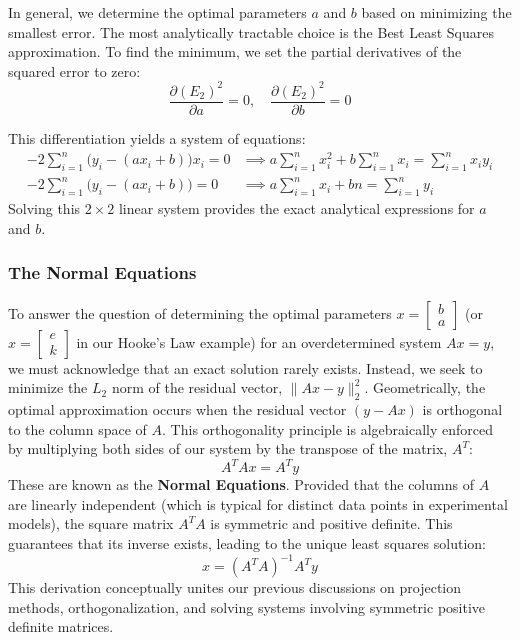\documentclass[12pt, a4paper]{article}
\theoremstyle{break}
\begin{document}
In general, we determine the optimal parameters $a$ and $b$ based on minimizing the smallest error. The most analytically tractable choice is the Best Least Squares approximation.
To find the minimum, we set the partial derivatives of the squared error to zero:
\begin{equation*}
    \frac{\partial (E_2)^2}{\partial a} = 0, \quad \frac{\partial (E_2)^2}{\partial b} = 0
\end{equation*}

This differentiation yields a system of equations:
\begin{align*}
    -2 \sum_{i=1}^n \big(y_i - (ax_i + b)\big)x_i = 0 &\implies a\sum_{i=1}^n x_i^2 + b\sum_{i=1}^n x_i = \sum_{i=1}^n x_i y_i \\
    -2 \sum_{i=1}^n \big(y_i - (ax_i + b)\big) = 0 &\implies a\sum_{i=1}^n x_i + bn = \sum_{i=1}^n y_i
\end{align*}
Solving this $2 \times 2$ linear system provides the exact analytical expressions for $a$ and $b$.
\subsubsection*{The Normal Equations}
To answer the question of determining the optimal parameters $x = \begin{bmatrix} b \\ a \end{bmatrix}$ (or $x = \begin{bmatrix} e \\ k \end{bmatrix}$ in our Hooke's Law example) for an overdetermined system $Ax = y$, we must acknowledge that an exact solution rarely exists.
Instead, we seek to minimize the $L_2$ norm of the residual vector, $\|Ax - y\|_2^2$.
Geometrically, the optimal approximation occurs when the residual vector $(y - Ax)$ is orthogonal to the column space of $A$.
This orthogonality principle is algebraically enforced by multiplying both sides of our system by the transpose of the matrix, $A^T$:
\begin{equation*}
    A^T A x = A^T y
\end{equation*}
These are known as the \textbf{Normal Equations}.
Provided that the columns of $A$ are linearly independent (which is typical for distinct data points in experimental models), the square matrix $A^T A$ is symmetric and positive definite.
This guarantees that its inverse exists, leading to the unique least squares solution:
\begin{equation*}
    x = (A^T A)^{-1} A^T y
\end{equation*}
This derivation conceptually unites our previous discussions on projection methods, orthogonalization, and solving systems involving symmetric positive definite matrices.
\end{document}

